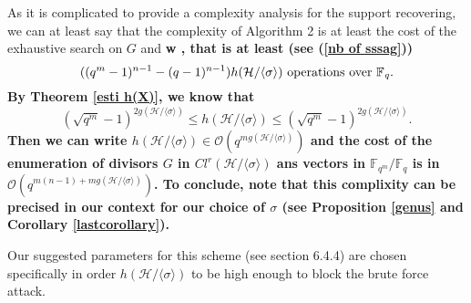 \documentclass[10pt]{article}
\newcommand{\s}{\vspace{0.3cm}}
\newcommand{\calH}{\mathcal{H}}
\newcommand{\fqm}{\mathbb{F}_{q^m}}
\newcommand{\fq}{\mathbb{F}_q}
\begin{document}
\s

As it is complicated to provide a complexity analysis for the support recovering, we can at least say that the complexity of Algorithm 2 is at least the cost of the exhaustive search on $G$ and \bf{w} \rm, that is at least (see (\ref{nb of sssag}))
\[ ((q^m-1)^{n-1}-(q-1)^{n-1})h(\mathcal{H}/\langle \sigma \rangle) \rm \ operations \ over \ \it \fq.\]
By Theorem \ref{esti h(X)}, we know that 
\[(\sqrt{q^m}-1)^{2g(\mathcal{H}/\langle \sigma \rangle)} \leq h(\mathcal{H}/\langle \sigma \rangle) \leq (\sqrt{q^m}-1)^{2g(\mathcal{H}/\langle \sigma \rangle)}.\] 
Then we can write $h(\mathcal{H}/\langle \sigma \rangle) \in \mathcal{O}(q^{mg(\mathcal{H}/\langle \sigma \rangle)})$ and the cost of the enumeration of divisors $G$ in $Cl^r(\mathcal{H}/\langle \sigma \rangle)$ ans vectors in $\fqm/\fq$ is in $\mathcal{O}(q^{m(n-1)+mg(\mathcal{H}/\langle \sigma \rangle)})$. 
To conclude, note that this complixity can be precised in our context for our choice of $\sigma$ (see Proposition \ref{genus} and Corollary \ref{lastcorollary}).

Our suggested parameters for this scheme (see section 6.4.4) are chosen specifically in order $h(\calH/\langle \sigma \rangle)$ to be high enough to block the brute force attack.










\newpage


\end{document}
